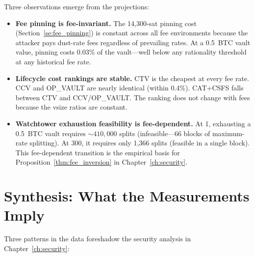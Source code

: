 Three observations emerge from the projections:

\begin{itemize}
\item \textbf{Fee pinning is fee-invariant.} The 14{,}300-sat pinning cost
  (Section~\ref{se:fee_pinning}) is constant across all fee environments because
  the attacker pays dust-rate fees regardless of prevailing rates. At a 0.5~BTC
  vault value, pinning costs 0.03\% of the vault---well below any rationality
  threshold at any historical fee rate.

\item \textbf{Lifecycle cost rankings are stable.} CTV is the cheapest at every fee
  rate. CCV and OP\_VAULT are nearly identical (within 0.4\%). CAT+CSFS falls between
  CTV and CCV/OP\_VAULT. The ranking does not change with fees because the vsize
  ratios are constant.

\item \textbf{Watchtower exhaustion feasibility is fee-dependent.} At 1\satvB{},
  exhausting a 0.5~BTC vault requires ${\sim}410{,}000$ splits (infeasible---66 blocks
  of maximum-rate splitting). At 300\satvB{}, it requires only 1{,}366 splits
  (feasible in a single block). This fee-dependent transition is the empirical basis
  for Proposition~\ref{thm:fee_inversion} in Chapter~\ref{ch:security}.
\end{itemize}

\section{Synthesis: What the Measurements Imply} \label{se:measurement_synthesis}

Three patterns in the data foreshadow the security analysis in
Chapter~\ref{ch:security}:

